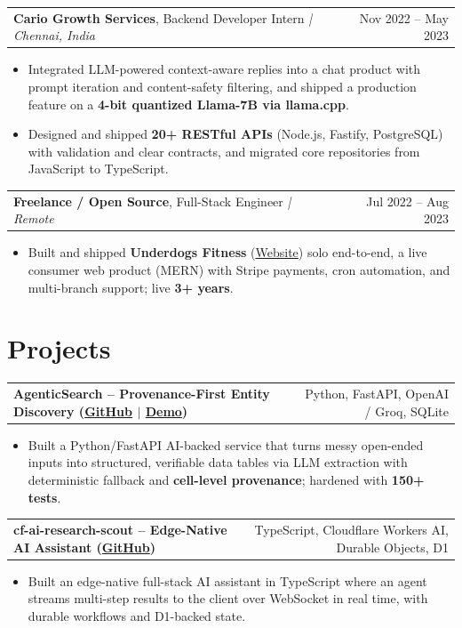 \documentclass[letterpaper,11pt]{article}
\makeatletter
\newcommand{\expItem}[4]{%
  \vspace{3pt}
  \begin{tabular*}{\textwidth}{@{}l@{\extracolsep{\fill}}r@{}}
    \textbf{#1}, #2 \textit{| #3} & #4 \\
  \end{tabular*}\par\vspace{-2pt}
}
\newcommand{\projItem}[2]{%
  \vspace{6pt}
  \begin{tabular*}{\textwidth}{@{}l@{\extracolsep{\fill}}r@{}}
    \textbf{#1} & #2 \\
  \end{tabular*}\par\vspace{-2pt}
}
\makeatother
\begin{document}
\expItem{Cario Growth Services}{Backend Developer Intern}{Chennai, India}{Nov 2022 -- May 2023}
\begin{itemize}
  \item Integrated LLM-powered context-aware replies into a chat product with prompt iteration and content-safety filtering, and shipped a production feature on a \textbf{4-bit quantized Llama-7B via llama.cpp}.
  \item Designed and shipped \textbf{20+ RESTful APIs} (Node.js, Fastify, PostgreSQL) with validation and clear contracts, and migrated core repositories from JavaScript to TypeScript.
\end{itemize}

\expItem{Freelance / Open Source}{Full-Stack Engineer}{Remote}{Jul 2022 -- Aug 2023}
\begin{itemize}
  \item Built and shipped \textbf{Underdogs Fitness} (\href{https://www.underdogsfitness.in/}{Website}) solo end-to-end, a live consumer web product (MERN) with Stripe payments, cron automation, and multi-branch support; live \textbf{3+ years}.
\end{itemize}

\section{Projects}

\projItem{AgenticSearch -- Provenance-First Entity Discovery {\normalfont\small(\href{https://github.com/Deva-1903/ciir_agentic_search}{GitHub} $\vert$ \href{https://agentic-search-negglszkwa-uc.a.run.app}{Demo})}}{Python, FastAPI, OpenAI / Groq, SQLite}
\begin{itemize}
  \item Built a Python/FastAPI AI-backed service that turns messy open-ended inputs into structured, verifiable data tables via LLM extraction with deterministic fallback and \textbf{cell-level provenance}; hardened with \textbf{150+ tests}.
\end{itemize}

\projItem{cf-ai-research-scout -- Edge-Native AI Assistant {\normalfont\small(\href{https://github.com/Deva-1903/cf_ai_research_scout}{GitHub})}}{TypeScript, Cloudflare Workers AI, Durable Objects, D1}
\begin{itemize}
  \item Built an edge-native full-stack AI assistant in TypeScript where an agent streams multi-step results to the client over WebSocket in real time, with durable workflows and D1-backed state.
\end{itemize}
\end{document}
